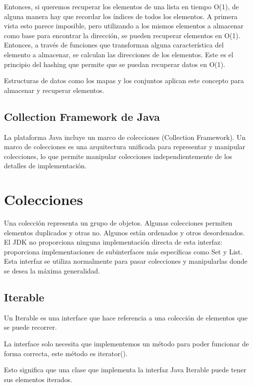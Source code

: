 \documentclass[11pt]{article}
\begin{document}
\par
Entonces, si queremos recuperar los elementos de una lista en tiempo 
O(1), de alguna manera hay que recordar los índices de todos los 
elementos. A primera vista esto parece imposible, pero utilizando a 
los mismos elementos a almacenar como base para encontrar la 
dirección, se pueden recuperar elementos en O(1). Entonces, a través 
de funciones que transforman alguna característica del elemento a 
almacenar, se calculan las direcciones de los elementos. Este es el 
principio del hashing que permite que se puedan recuperar datos en 
O(1). 
\par
Estructuras de datos como los mapas y los conjuntos aplican este 
concepto para almacenar y recuperar elementos. 

\subsection{Collection Framework de Java}
\par
La plataforma Java incluye un marco de colecciones (Collection 
Framework). Un marco de colecciones es una arquitectura unificada 
para representar y manipular colecciones, lo que permite manipular 
colecciones independientemente de los detalles de implementación. 

\section{Colecciones}
\par
Una colección representa un grupo de objetos. Algunas colecciones 
permiten elementos duplicados y otras no. Algunos están ordenados y 
otros desordenados. El JDK no proporciona ninguna implementación 
directa de esta interfaz: proporciona implementaciones de 
subinterfaces más específicas como Set y List. Esta interfaz se 
utiliza normalmente para pasar colecciones y manipularlas donde se 
desea la máxima generalidad.

\subsection{Iterable}
\par
Un Iterable es una interface que hace referencia a una colección de 
elementos que se puede recorrer.
\par
La interface solo necesita que implementemos un método para poder 
funcionar de forma correcta, este método es iterator().
\par
Esto significa que una clase que implementa la interfaz Java Iterable 
puede tener sus elementos iterados. 
\end{document}
